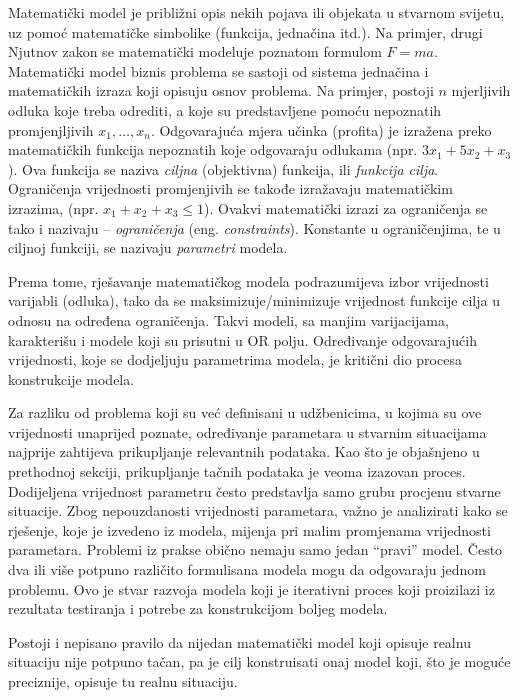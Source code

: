 \documentclass[a4paper, utf8, 11pt, colorlinks]{book}
\theoremstyle{definition}
\begin{document}
Matematički model je približni opis nekih pojava ili objekata u stvarnom svijetu, uz pomoć matematičke simbolike (funkcija, jednačina itd.). Na primjer, drugi Njutnov zakon se matematički modeluje poznatom formulom $F=ma$. Matematički model biznis problema   
se sastoji od sistema jednačina i matematičkih izraza koji opisuju osnov problema. Na primjer, postoji $n$ mjerljivih odluka koje treba odrediti, a koje su predstavljene pomoću nepoznatih promjenjljivih $x_1,\ldots, x_n$.  Odgovarajuća mjera učinka (profita) je izražena preko matematičkih funkcija nepoznatih koje odgovaraju  odlukama (npr. $3x_1 + 5x_2 + x_3$). Ova funkcija se naziva \emph{ciljna} (objektivna) funkcija, ili \emph{funkcija cilja}. Ograničenja  vrijednosti promjenjivih se takođe izražavaju matematičkim izrazima, (npr. $x_1 + x_2 + x_3 \leq 1$).  Ovakvi matematički izrazi za ograničenja se tako i nazivaju -- \emph{ograničenja} (eng. \emph{constraints}). Konstante u ograničenjima, te u ciljnoj funkciji, se nazivaju \emph{parametri} modela.

Prema tome, rješavanje matematičkog modela 
podrazumijeva izbor vrijednosti varijabli (odluka), tako da se maksimizuje/minimizuje vrijednost funkcije cilja u odnosu na određena ograničenja. Takvi modeli, sa manjim varijacijama, karakterišu i modele koji su prisutni u OR polju. 
Određivanje odgovarajućih vrijednosti, koje se dodjeljuju parametrima modela, je kritični dio procesa konstrukcije modela.

Za razliku od problema koji su već definisani u udžbenicima, u kojima su ove vrijednosti unaprijed poznate,   određivanje parametara u stvarnim situacijama najprije zahtijeva prikupljanje relevantnih podataka. Kao što je objašnjeno u prethodnoj sekciji,  prikupljanje tačnih podataka je veoma izazovan proces. Dodijeljena vrijednost parametru često predstavlja  samo grubu procjenu stvarne situacije. Zbog nepouzdanosti vrijednosti parametara, važno je analizirati kako se rješenje, koje je izvedeno iz modela, mijenja pri malim promjenama vrijednosti parametara. 
 Problemi iz prakse obično nemaju samo jedan ``pravi'' model. Često   dva ili više potpuno različito formulisana modela mogu da odgovaraju jednom problemu. 
Ovo je stvar razvoja modela koji je iterativni proces koji proizilazi iz rezultata testiranja i potrebe za konstrukcijom boljeg modela.

Postoji i nepisano pravilo da nijedan matematički model koji opisuje realnu situaciju nije potpuno tačan, pa je cilj konstruisati onaj model koji,  što je moguće preciznije, opisuje tu realnu situaciju.
\end{document}
